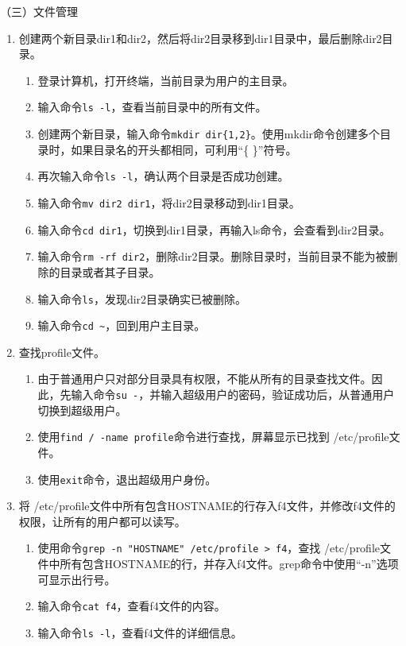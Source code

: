 \vspace{0.1in}
（三）文件管理
\begin{enumerate}
  \item 创建两个新目录dir1和dir2，然后将dir2目录移到dir1目录中，最后删除dir2目录。
    \begin{enumerate}
      \item 登录计算机，打开终端，当前目录为用户的主目录。
      \item 输入命令\verb|ls -l|，查看当前目录中的所有文件。
      \item 创建两个新目录，输入命令\verb|mkdir dir{1,2}|。使用mkdir命令创建多个目录时，如果目录名的开头都相同，可利用“\{ \}”符号。
      \item 再次输入命令\verb|ls -l|，确认两个目录是否成功创建。
      \item 输入命令\verb|mv dir2 dir1|，将dir2目录移动到dir1目录。
      \item 输入命令\verb|cd dir1|，切换到dir1目录，再输入ls命令，会查看到dir2目录。
      \item 输入命令\verb|rm -rf dir2|，删除dir2目录。删除目录时，当前目录不能为被删除的目录或者其子目录。
      \item 输入命令\verb|ls|，发现dir2目录确实已被删除。
      \item 输入命令\verb|cd ~|，回到用户主目录。
    \end{enumerate}
  \item 查找profile文件。
    \begin{enumerate}
      \item 由于普通用户只对部分目录具有权限，不能从所有的目录查找文件。因此，先输入命令\verb|su -|，并输入超级用户的密码，验证成功后，从普通用户切换到超级用户。
      \item 使用\verb|find / -name profile|命令进行查找，屏幕显示已找到 /etc/profile文件。
      \item 使用\verb|exit|命令，退出超级用户身份。
    \end{enumerate}
  \item 将 /etc/profile文件中所有包含HOSTNAME的行存入f4文件，并修改f4文件的权限，让所有的用户都可以读写。
    \begin{enumerate}
      \item 使用命令\verb|grep -n "HOSTNAME" /etc/profile > f4|，查找 /etc/profile文件中所有包含HOSTNAME的行，并存入f4文件。grep命令中使用“-n”选项可显示出行号。
      \item 输入命令\verb|cat f4|，查看f4文件的内容。
      \item 输入命令\verb|ls -l|，查看f4文件的详细信息。

\end{enumerate}
\end{enumerate}
